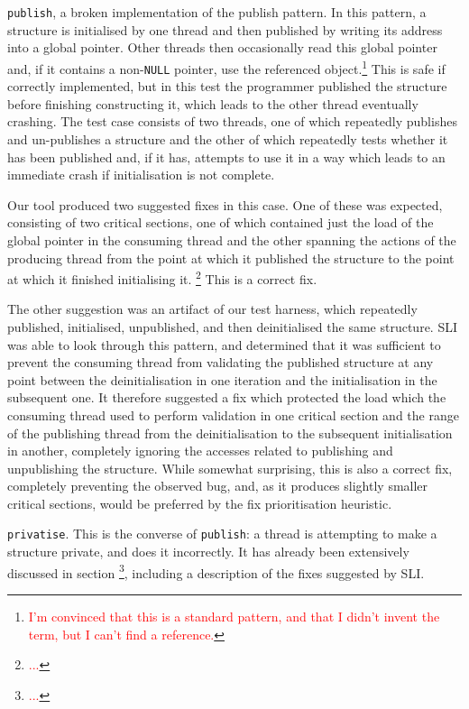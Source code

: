 \documentclass[10pt,twocolumn,preprint,natbib,authoryear]{sigplanconf}
\newcommand{\editorial}[1]{\textcolor{red}{\footnote{\textcolor{red}{#1}}}}
\begin{document}
\verb|publish|, a broken implementation of the publish pattern.  In
this pattern, a structure is initialised by one thread and then
published by writing its address into a global pointer.  Other threads
then occasionally read this global pointer and, if it contains a
non-\verb|NULL| pointer, use the referenced object.\editorial{I'm
  convinced that this is a standard pattern, and that I didn't invent
  the term, but I can't find a reference.}  This is safe if correctly
implemented, but in this test the programmer published the structure
before finishing constructing it, which leads to the other thread
eventually crashing.  The test case consists of two threads, one of
which repeatedly publishes and un-publishes a structure and the other
of which repeatedly tests whether it has been published and, if it
has, attempts to use it in a way which leads to an immediate crash if
initialisation is not complete.

Our tool produced two suggested fixes in this case.  One of these was
expected, consisting of two critical sections, one of which contained
just the load of the global pointer in the consuming thread and the
other spanning the actions of the producing thread from the point at
which it published the structure to the point at which it finished
initialising it. \editorial{...}  This is a correct fix.

The other suggestion was an artifact of our test harness, which
repeatedly published, initialised, unpublished, and then deinitialised
the same structure.  SLI was able to look through this pattern, and
determined that it was sufficient to prevent the consuming thread from
validating the published structure at any point between the
deinitialisation in one iteration and the initialisation in the
subsequent one.  It therefore suggested a fix which protected the load
which the consuming thread used to perform validation in one critical
section and the range of the publishing thread from the
deinitialisation to the subsequent initialisation in another,
completely ignoring the accesses related to publishing and
unpublishing the structure.  While somewhat surprising, this is also a
correct fix, completely preventing the observed bug, and, as it
produces slightly smaller critical sections, would be preferred by the
fix prioritisation heuristic.

\verb|privatise|.  This is the converse of \verb|publish|: a thread is
attempting to make a structure private, and does it incorrectly.  It
has already been extensively discussed in section \editorial{...},
including a description of the fixes suggested by SLI.
\end{document}
